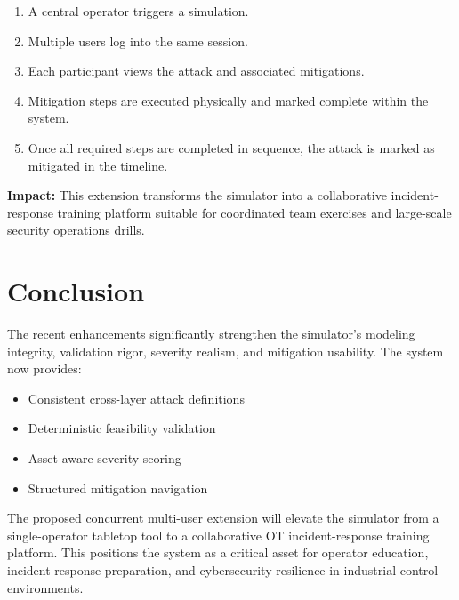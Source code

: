 \documentclass[12pt]{article}
\begin{document}
\begin{enumerate}[leftmargin=1.5em]
\item A central operator triggers a simulation.
\item Multiple users log into the same session.
\item Each participant views the attack and associated mitigations.
\item Mitigation steps are executed physically and marked complete within the system.
\item Once all required steps are completed in sequence, the attack is marked as mitigated in the timeline.
\end{enumerate}

\begin{tcolorbox}[colback=boxbg, colframe=primary, boxrule=1.5pt, arc=5pt, left=10pt, right=10pt, top=10pt, bottom=10pt]
\textbf{\color{primary}Impact:} This extension transforms the simulator into a collaborative incident-response training platform suitable for coordinated team exercises and large-scale security operations drills.
\end{tcolorbox}

\section{Conclusion}

The recent enhancements significantly strengthen the simulator's modeling integrity, validation rigor, severity realism, and mitigation usability. The system now provides:

\begin{highlight}
\begin{itemize}[leftmargin=1.5em, topsep=0pt, partopsep=0pt]
\item Consistent cross-layer attack definitions
\item Deterministic feasibility validation
\item Asset-aware severity scoring
\item Structured mitigation navigation
\end{itemize}
\end{highlight}

The proposed concurrent multi-user extension will elevate the simulator from a single-operator tabletop tool to a collaborative OT incident-response training platform. This positions the system as a critical asset for operator education, incident response preparation, and cybersecurity resilience in industrial control environments.
\end{document}
